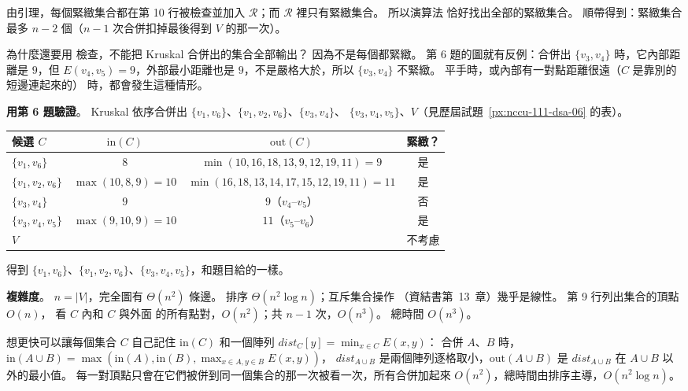 \begin{pastsoln}
由引理，每個緊緻集合都在第 10 行被檢查並加入 $\mathcal{R}$；而 $\mathcal{R}$ 裡只有緊緻集合。 所以演算法
恰好找出全部的緊緻集合。 順帶得到：緊緻集合最多 $n - 2$ 個（$n - 1$ 次合併扣掉最後得到 $V$ 的那一次）。

為什麼還要用  檢查，不能把 Kruskal 合併出的集合全部輸出？ 因為不是每個都緊緻。
第 6 題的圖就有反例：合併出 $\{v_3, v_4\}$ 時，它內部距離是 $9$，但 $E(v_4, v_5) = 9$，外部最小距離也是
$9$，不是嚴格大於，所以 $\{v_3, v_4\}$ 不緊緻。 平手時，或內部有一對點距離很遠（$C$ 是靠別的短邊連起來的）
時，都會發生這種情形。

\textbf{用第 6 題驗證}。 Kruskal 依序合併出 $\{v_1, v_6\}$、$\{v_1, v_2, v_6\}$、$\{v_3, v_4\}$、
$\{v_3, v_4, v_5\}$、$V$（見歷屆試題~\ref{px:nccu-111-dsa-06} 的表）。
\begin{center}
\begin{tabular}{lccc}
\toprule
候選 $C$ & $\mathrm{in}(C)$ & $\mathrm{out}(C)$ & 緊緻？ \\
\midrule
$\{v_1, v_6\}$ & $8$ & $\min(10, 16, 18, 13, 9, 12, 19, 11) = 9$ & 是 \\
$\{v_1, v_2, v_6\}$ & $\max(10, 8, 9) = 10$ & $\min(16, 18, 13, 14, 17, 15, 12, 19, 11) = 11$ & 是 \\
$\{v_3, v_4\}$ & $9$ & $9$（$v_4$--$v_5$） & 否 \\
$\{v_3, v_4, v_5\}$ & $\max(9, 10, 9) = 10$ & $11$（$v_5$--$v_6$） & 是 \\
$V$ & & & 不考慮 \\
\bottomrule
\end{tabular}
\end{center}
得到 $\{v_1, v_6\}$、$\{v_1, v_2, v_6\}$、$\{v_3, v_4, v_5\}$，和題目給的一樣。

\textbf{複雜度}。 $n = |V|$，完全圖有 $\Theta(n^2)$ 條邊。 排序 $\Theta(n^2 \log n)$；互斥集合操作
（資結書第~13~章）幾乎是線性。 第 9 行列出集合的頂點 $O(n)$， 看 $C$ 內和 $C$ 與外面
的所有點對，$O(n^2)$；共 $n - 1$ 次，$O(n^3)$。 總時間 $O(n^3)$。

想更快可以讓每個集合 $C$ 自己記住 $\mathrm{in}(C)$ 和一個陣列 $\mathit{dist}_C[y] = \min_{x \in C} E(x, y)$：
合併 $A$、$B$ 時，$\mathrm{in}(A \cup B) = \max(\mathrm{in}(A), \mathrm{in}(B), \max_{x \in A, y \in B} E(x, y))$，
$\mathit{dist}_{A \cup B}$ 是兩個陣列逐格取小，$\mathrm{out}(A \cup B)$ 是 $\mathit{dist}_{A \cup B}$ 在
$A \cup B$ 以外的最小值。 每一對頂點只會在它們被併到同一個集合的那一次被看一次，所有合併加起來
$O(n^2)$，總時間由排序主導，$O(n^2 \log n)$。
\end{pastsoln}
